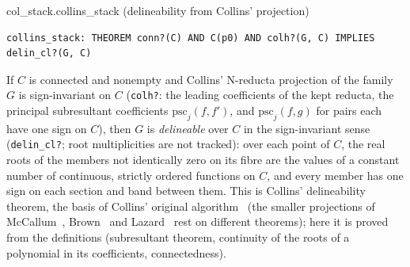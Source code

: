 \documentclass[11pt]{article}
\newcommand\code[1]{\mbox{\texttt{#1}}}
\begin{document}
\begin{thmbox}{col\_stack.collins\_stack \quad (delineability from Collins' projection)}
\begin{Verbatim}[fontsize=\small]
collins_stack: THEOREM conn?(C) AND C(p0) AND colh?(G, C) IMPLIES delin_cl?(G, C)
\end{Verbatim}
\end{thmbox}
If $C$ is connected and nonempty and Collins' N-reducta projection of the family $G$ is sign-invariant on $C$
(\code{colh?}: the leading coefficients of the kept reducta, the principal subresultant coefficients
$\mathrm{psc}_j(f, f')$, and $\mathrm{psc}_j(f, g)$ for pairs each have one sign on $C$), then $G$ is
\emph{delineable} over $C$ in the sign-invariant sense (\code{delin\_cl?}; root multiplicities are not tracked):
over each point of $C$, the real roots of the members not identically zero on its fibre are the values of a
constant number of continuous, strictly ordered functions on $C$, and every member has one sign on each section and band
between them. This is Collins' delineability theorem, the basis of Collins' original algorithm~\cite{collins} (the smaller
projections of McCallum~\cite{mccallum}, Brown~\cite{brown} and Lazard~\cite{lazard,mpp} rest on different theorems); here it is proved from the definitions
(subresultant theorem, continuity of the roots of a polynomial in its coefficients, connectedness).
\end{document}
